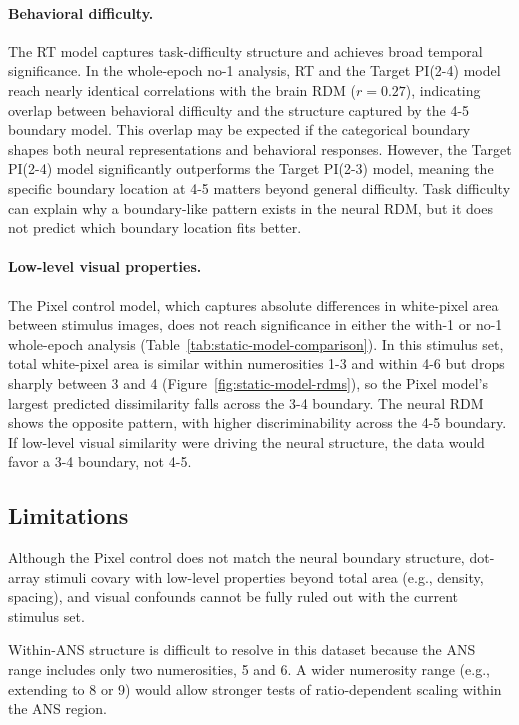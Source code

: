 \paragraph{Behavioral difficulty.}
The RT model captures task-difficulty structure and achieves broad
temporal significance. In the whole-epoch no-1 analysis, RT and the
Target PI(2-4) model reach nearly identical correlations with the brain RDM
($r = 0.27$), indicating overlap between behavioral difficulty and the
structure captured by the 4-5 boundary model. This overlap may be expected if the categorical
boundary shapes both neural representations and behavioral responses.
However, the Target PI(2-4) model significantly outperforms the Target PI(2-3) model,
meaning the specific boundary location at 4-5 matters beyond general
difficulty. Task difficulty can explain why a boundary-like pattern
exists in the neural RDM, but it does not predict which boundary
location fits better.

\paragraph{Low-level visual properties.}
The Pixel control model, which captures absolute differences in
white-pixel area between stimulus images, does not reach significance in
either the with-1 or no-1 whole-epoch analysis
(Table~\ref{tab:static-model-comparison}). In this stimulus set, total
white-pixel area is similar within numerosities 1-3 and within 4-6 but
drops sharply between 3 and 4 (Figure~\ref{fig:static-model-rdms}), so
the Pixel model's largest predicted dissimilarity falls across the 3-4
boundary. The neural RDM shows the opposite pattern, with higher
discriminability across the 4-5 boundary. If low-level visual similarity
were driving the neural structure, the data would favor a 3-4 boundary,
not 4-5.

\subsection{Limitations}

Although the Pixel control does not match the neural boundary structure,
dot-array stimuli covary with low-level properties beyond total area
(e.g., density, spacing), and visual confounds cannot be fully ruled out
with the current stimulus set.

Within-ANS structure is difficult to resolve in this dataset because
the ANS range includes only two numerosities, 5 and 6. A wider
numerosity range (e.g., extending to 8 or 9) would allow stronger
tests of ratio-dependent scaling within the ANS region.

